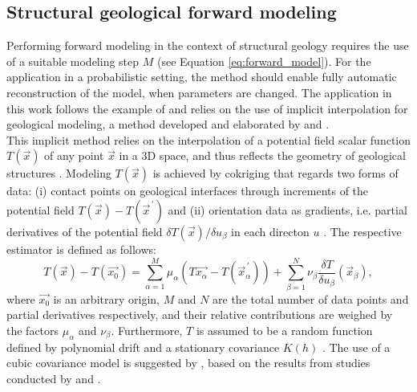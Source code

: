         \subsection{Structural geological forward modeling}\label{sec:struc_geo_modeling}       
        Performing forward modeling in the context of structural geology requires the use of a suitable modeling step $M$ (see Equation \ref{eq:forward_model}). For the application in a probabilistic setting, the method should enable fully automatic reconstruction of the model, when parameters are changed. The application in this work follows the example of \citet{delaVarga2016} and relies on the use of implicit interpolation for geological modeling, a method developed and elaborated by \citet{Lajaunie1997} and \citet{calcagno2008geological}.\\
        This implicit method relies on the interpolation of a potential field scalar function $T(\vec{x})$ of any point $\vec{x}$ in a 3D space, and thus reflects the geometry of geological structures \citep{calcagno2008geological}. Modeling $T(\vec{x})$ is achieved by cokriging that regards two forms of data: (i) contact points on geological interfaces through increments of the potential field $T(\vec{x})-T(\vec{x}^{\,'})$ and (ii) orientation data as gradients, i.e. partial derivatives of the potential field $\delta T(\vec{x})/\delta u_\beta$ in each directon $u$ \citep{calcagno2008geological}. The respective estimator is defined as follows:
        \begin{equation}\label{eq:Cokriging_Estimator}
                T(\vec{x})-T(\vec{x_0})=\sum_{\alpha=1}^{M}\mu_\alpha(T\vec{x_\alpha}-T(\vec{x}^{\,'}_\alpha))+\sum_{\beta=1}^{N}\nu_\beta\frac{\delta T}{\delta u_\beta}(\vec{x}_\beta),
        \end{equation}        
        where $\vec{x_0}$ is an arbitrary origin, $M$ and $N$ are the total number of data points and partial derivatives respectively, and their relative contributions are weighed by the factors $\mu_\alpha$ and $\nu_\beta$. Furthermore, $T$ is assumed to be a random function defined by polynomial drift and a stationary covariance $K(h)$ \citep{calcagno2008geological}. The use of a cubic covariance model is suggested by \citet{calcagno2008geological}, based on the results from studies conducted by \citet{aug2004modelisation} and \citet{chiles2004modelling}.

